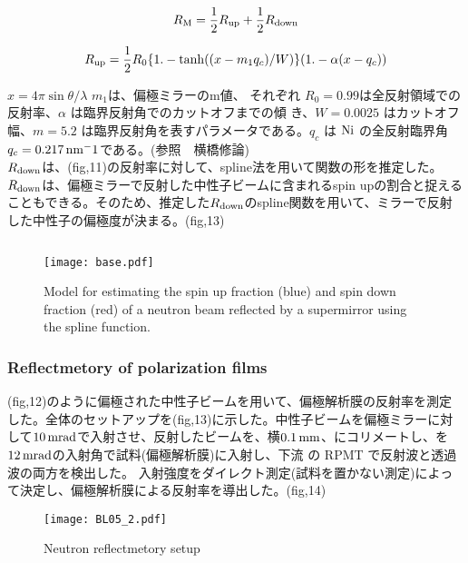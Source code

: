\documentclass[onecolumn]{preport}
\begin{document}
\begin{equation}
\label{RM1}
R_{\rm M}=\frac{1}{2} R_{\rm up}+\frac{1}{2} R_{\rm down}
\end{equation}

\begin{equation}
\label{RM2}
R_{\rm up}=\frac{1}{2}R_0\{1.-\tanh((x-m_1 q_c)/W)\}(1.-\alpha(x-q_c))
\end{equation}

$x=4\pi \sin \theta/\lambda$ $m_1$は、偏極ミラーのm値、
それぞれ $R_0=0.99$は全反射領域での反射率、$\alpha$ は臨界反射角でのカットオフまでの傾 き、$W=0.0025$ はカットオフ幅、$m=5.2$ は臨界反射角を表すパラメータである。$q_c$ は $\rm Ni$ の全反射臨界角 $q_c = 0.217 \,\rm nm^-1$である。(参照　横橋修論)\\
$R_{\rm down}$は、(fig,11)の反射率に対して、spline法を用いて関数の形を推定した。$R_{\rm down}$は、偏極ミラーで反射した中性子ビームに含まれるspin upの割合と捉えることもできる。そのため、推定した$R_{\rm down}$のspline関数を用いて、ミラーで反射した中性子の偏極度が決まる。(fig,13)



\begin{equation}
\end{equation}

\begin{figure}[tbh]
 \centering
 \texttt{[image: base.pdf]}
 \caption{Model for estimating the spin up fraction (blue) and spin down fraction (red) of a neutron beam reflected by a supermirror using the spline function.}
\end{figure}


\subsubsection{Reflectmetory of polarization films}
(fig,12)のように偏極された中性子ビームを用いて、偏極解析膜の反射率を測定した。全体のセットアップを(fig,13)に示した。中性子ビームを偏極ミラーに対して$10\,\rm mrad$で入射させ、反射したビームを、横$0.1\,\rm mm$、にコリメートし、を$12\,\rm mrad$の入射角で試料(偏極解析膜)に入射し、下流 の RPMT で反射波と透過波の両方を検出した。
入射強度をダイレクト測定(試料を置かない測定)によって決定し、偏極解析膜による反射率を導出した。(fig,14)

\begin{figure}[tbh]
 \centering
 \texttt{[image: BL05\_2.pdf]}
 \caption{Neutron reflectmetory setup}
\end{figure}
\end{document}
